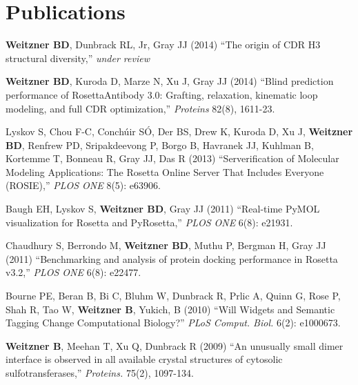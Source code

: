 \documentclass[12pt]{scrartcl}
\newcommand{\allcapsspacing}[1]{{\addfontfeature{LetterSpace=7.5}#1}}
\begin{document}
\pagebreak
\section*{\allcapsspacing{Publications}}
\noindent \textbf{Weitzner BD}, Dunbrack RL, Jr, Gray JJ (2014) ``The origin of CDR H3 structural diversity,'' \textit{under review} 

\vspace{0.75\baselineskip}

\noindent \textbf{Weitzner BD}, Kuroda D, Marze N, Xu J, Gray JJ (2014) ``Blind prediction performance of RosettaAntibody 3.0: Grafting, relaxation, kinematic loop modeling, and full CDR optimization,'' \textit{Proteins} 82(8), 1611-23. 

\vspace{0.75\baselineskip}

\noindent Lyskov S, Chou F-C, Conch{\'u}ir S{\'O}, Der BS, Drew K, Kuroda D, Xu J, \textbf{Weitzner BD}, Renfrew PD, Sripakdeevong P, Borgo B, Havranek JJ, Kuhlman B, Kortemme T, Bonneau R, Gray JJ, Das R (2013) ``Serverification of Molecular Modeling Applications: The Rosetta Online Server That Includes Everyone (ROSIE),'' \textit{PLOS ONE} 8(5): e63906.

\vspace{0.75\baselineskip}

\noindent Baugh EH, Lyskov S, \textbf{Weitzner BD}, Gray JJ (2011) ``Real-time PyMOL visualization for Rosetta and PyRosetta,'' \textit{PLOS ONE} 6(8): e21931.

\vspace{0.75\baselineskip}

\noindent Chaudhury S, Berrondo M, \textbf{Weitzner BD}, Muthu P, Bergman H, Gray JJ (2011) ``Benchmarking and analysis of protein docking performance in Rosetta v3.2,'' \textit{PLOS ONE} 6(8): e22477.

\vspace{0.75\baselineskip}

\noindent Bourne PE, Beran B, Bi C, Bluhm W, Dunbrack R, Prlic A, Quinn G, Rose P, Shah R, Tao W, \textbf{Weitzner B}, Yukich, B (2010) ``Will Widgets and Semantic Tagging Change Computational Biology?'' \textit{PLoS Comput. Biol.} 6(2): e1000673.

\vspace{0.75\baselineskip}

\noindent\textbf{Weitzner B}, Meehan T, Xu Q, Dunbrack R (2009) ``An unusually small dimer interface is observed in all available crystal structures of cytosolic sulfotransferases,'' \textit{Proteins.} 75(2), 1097-134.
\end{document}

